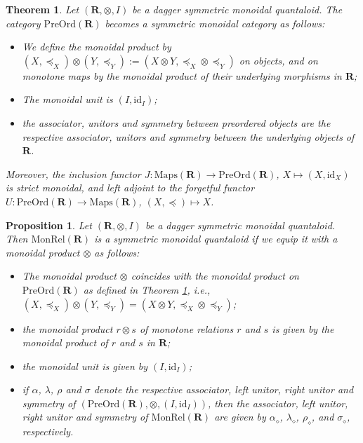 \documentclass[10pt,a4paper]{amsart}
\newtheorem{theorem}{Theorem}
\newtheorem{proposition}{Proposition}
\newcommand{\id}{\mathrm{id}}
\newcommand{\qo}{{\boldsymbol{\preccurlyeq}}}
\begin{document}
\begin{theorem}\label{thm:monoidal structure PreOrd}
Let $(\mathbf R,\otimes,I)$ be a dagger symmetric monoidal quantaloid. The category $\mathrm{PreOrd}(\mathbf R)$ becomes a symmetric monoidal category as follows:
\begin{itemize}
    \item We define the monoidal product by $(X,\qo_X)\otimes(Y,\qo_Y):=(X\otimes Y,\qo_X\otimes\qo_Y)$ on objects, and on monotone maps by the monoidal product of their underlying morphisms in $\mathbf R$;
    \item The monoidal unit is $(I, \id_I)$;
    \item the associator, unitors and symmetry between preordered objects are the respective associator, unitors and symmetry between the underlying objects of $\mathbf R$.
\end{itemize}   Moreover, the inclusion functor $J:\mathrm{Maps}(\mathbf R)\to\mathrm{PreOrd}(\mathbf{R})$, $X\mapsto (X,\id_X)$ is strict monoidal, and left adjoint to the forgetful functor $U:\mathrm{PreOrd}(\mathbf R)\to\mathrm{Maps}(\mathbf R)$, $(X,\qo)\mapsto X$.
\end{theorem}

\begin{proposition}\label{prop:MonRel is symmetric monoidal}
   Let $(\mathbf R,\otimes,I)$ be a dagger symmetric monoidal quantaloid. Then
   $\mathrm{MonRel}(\mathbf R)$ is a symmetric monoidal quantaloid if we equip it with a monoidal product $\otimes$ as follows:
   \begin{itemize}
       \item The monoidal product $\otimes$ coincides with the monoidal product on $\mathrm{PreOrd}(\mathbf R)$ as defined in Theorem \ref{thm:monoidal structure PreOrd}, i.e., $(X,\qo_X)\otimes (Y,\qo_Y)=(X\otimes Y,\qo_X\otimes\qo_Y)$;
       \item the monoidal product $r\otimes s$ of monotone relations $r$ and $s$ is given by the monoidal product of $r$ and $s$ in $\mathbf R$;
       \item the monoidal unit is given by $(I,\id_I)$;
       \item if $\alpha$, $\lambda$, $\rho$ and $\sigma$ denote the respective associator, left unitor, right unitor and symmetry of $(\mathrm{PreOrd}(\mathbf R),\otimes,(I,\id_I))$, then  the associator, left unitor, right unitor and symmetry of $\mathrm{MonRel}(\mathbf R)$ are given by $\alpha_\diamond$, $\lambda_\diamond$, $\rho_\diamond$, and $\sigma_\diamond$, respectively.
   \end{itemize}
\end{proposition}
\end{document}
